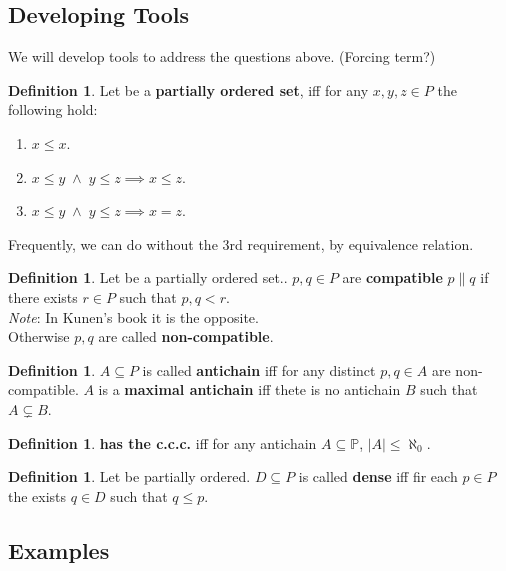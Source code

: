 \documentclass[11pt,pdftex,twoside,a4paper]{article}
\newcommand{\B}[1]{\textbf{#1}}
\newcommand{\ccc}{c.c.c.}
\theoremstyle{definition}
\newtheorem{ldef}[thm]{Definition}
\begin{document}
\subsection{Developing Tools}

We will develop tools to address the questions above.
(Forcing term?)

\begin{ldef}
Let  be a \B{partially ordered set},
iff for any \(x,y,z\in P\) the following hold:
\begin{enumerate}
\item \(x\leq x\).
\item \(x\leq y \; \land\; y\leq z \implies x \leq z\).
\item \(x \leq y\; \land\; y \leq z \implies x = z\).
\end{enumerate}
\end{ldef}
Frequently, we can do without the 3rd requirement, by equivalence relation.

\begin{ldef}
Let  be a {partially ordered set}..
\(p,q \in P\) are \B{compatible} \(p \| q\) if there exists \(r\in P\)
such that \(p,q < r\).\\
\emph{Note}: \textnormal{In Kunen's book it is the opposite.}\\
Otherwise \(p,q\) are called \B{non-compatible}.
\end{ldef}

\begin{ldef}
\(A\subseteq P\) is called \B{antichain} iff for any
 distinct \(p,q\in A\) are non-compatible.
$A$ is a \B{maximal antichain} iff thete is no antichain $B$
such that \(A \subsetneq B\).
\end{ldef}

\begin{ldef}
 \B{has the \ccc} iff 
for any antichain \(A \subseteq \mathbb{P}\), 
\(|A|\leq \aleph_0\).
\end{ldef}

\begin{ldef}
Let  be partially ordered.
\(D\subseteq P\) is called \B{dense} iff fir each \(p\in P\)
the exists \(q\in D\) such that \(q\leq p\).
\end{ldef}

\subsection{Examples}
\end{document}
